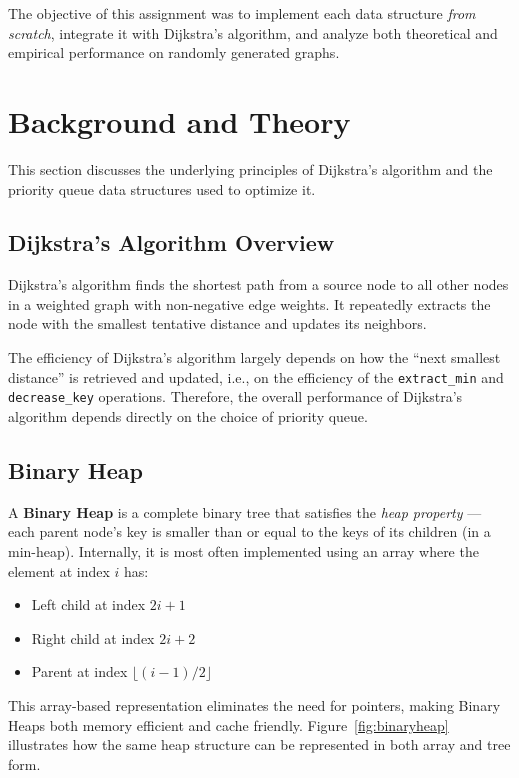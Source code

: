 \documentclass[acmsmall]{acmart}
\begin{document}
\vspace{1em}
The objective of this assignment was to implement each data structure \emph{from scratch}, integrate it with Dijkstra’s algorithm, and analyze both theoretical and empirical performance on randomly generated graphs.

\section{Background and Theory}
This section discusses the underlying principles of Dijkstra’s algorithm and the priority queue data structures used to optimize it.

\subsection{Dijkstra’s Algorithm Overview}
Dijkstra’s algorithm finds the shortest path from a source node to all other nodes in a weighted graph with non-negative edge weights. It repeatedly extracts the node with the smallest tentative distance and updates its neighbors.  

The efficiency of Dijkstra’s algorithm largely depends on how the “next smallest distance” is retrieved and updated, i.e., on the efficiency of the \texttt{extract\_min} and \texttt{decrease\_key} operations. Therefore, the overall performance of Dijkstra’s algorithm depends directly on the choice of priority queue.

\subsection{Binary Heap}
A \textbf{Binary Heap} is a complete binary tree that satisfies the \emph{heap property} — each parent node’s key is smaller than or equal to the keys of its children (in a min-heap). Internally, it is most often implemented using an array where the element at index $i$ has:
\begin{itemize}
  \item Left child at index $2i + 1$
  \item Right child at index $2i + 2$
  \item Parent at index $\lfloor (i - 1)/2 \rfloor$
\end{itemize}

This array-based representation eliminates the need for pointers, making Binary Heaps both memory efficient and cache friendly. Figure~\ref{fig:binaryheap} illustrates how the same heap structure can be represented in both array and tree form.
\end{document}
